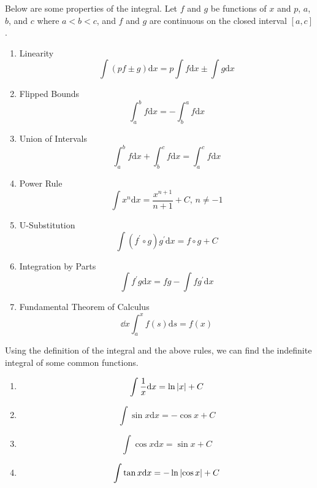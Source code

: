 \noindent
Below are some properties of the integral. Let $f$ and $g$ be functions of $x$ and $p$, $a$, $b$, and $c$ where $a < b < c$, and $f$ and $g$ are continuous on the closed interval $[a,c]$.
\begin{enumerate}[label=]
	\item Linearity
	\begin{equation*}
	\int{(pf \pm g) \mathrm{d}x} = p\int{f \mathrm{d}x} \pm \int{g \mathrm{d}x}
	\end{equation*}
	\item Flipped Bounds
	\begin{equation*}
	\int_{a}^{b}{f \mathrm{d}x} = -\int_{b}^{a}{f \mathrm{d}x}
	\end{equation*}
	\item Union of Intervals
	\begin{equation*}
	\int_{a}^{b}{f \mathrm{d}x} + \int_{b}^{c}{f \mathrm{d}x} = \int_{a}^{c}{f \mathrm{d}x}
	\end{equation*}
	\item Power Rule
	\begin{equation*}
	\int{x^n \mathrm{d}x} = \frac{x^{n+1}}{n+1} + C \text{, }n \neq -1
	\end{equation*}
	\item U-Substitution
	\begin{equation*}
	\int{\left(f^\prime\circ g\right) g^\prime \mathrm{d}x} = f\circ g+ C
	\end{equation*}
	\item Integration by Parts
	\begin{equation*}
	\int{f^\prime g \mathrm{d}x} = fg - \int{fg^\prime \mathrm{d}x}
	\end{equation*}
	\item Fundamental Theorem of Calculus
	\begin{equation*}
	\dd{x}\int_{a}^{x}{f(s) \mathrm{d}s} = f(x)
	\end{equation*}
\end{enumerate}
Using the definition of the integral and the above rules, we can find the indefinite integral of some common functions.
\begin{enumerate}[label=]
	\item 
	\begin{equation*}
	\int{\frac{1}{x} \mathrm{d}x} = \ln{\lvert x \rvert} + C
	\end{equation*}
	\item 
	\begin{equation*}
	\int{\sin{x} \mathrm{d}x} = -\cos{x} + C
	\end{equation*}
	\item 
	\begin{equation*}
	\int{\cos{x} \mathrm{d}x} = \sin{x} + C
	\end{equation*}
	\item 
	\begin{equation*}
	\int{\tan{x} \mathrm{d}x} = -\ln{\lvert \cos{x} \rvert} + C
	\end{equation*}
\end{enumerate}
